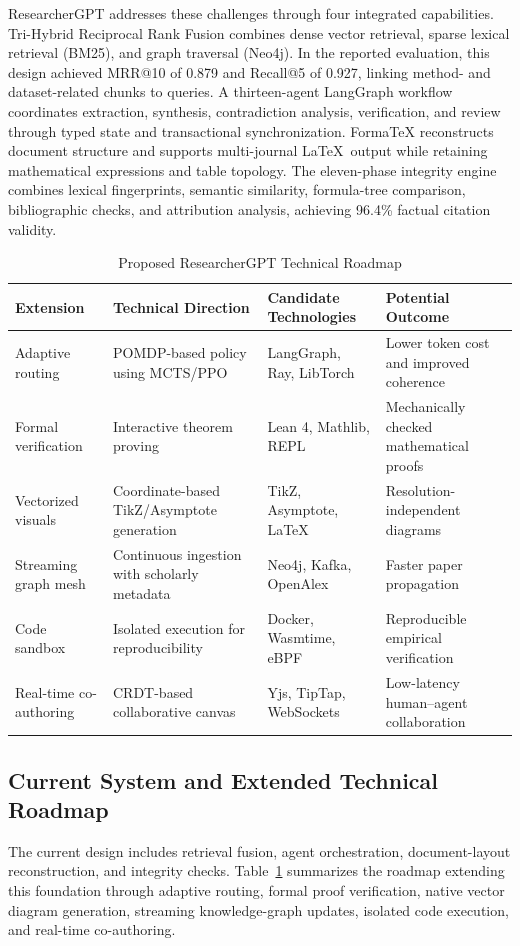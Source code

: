 \documentclass[conference]{IEEEtran}
\begin{document}
ResearcherGPT addresses these challenges through four integrated capabilities. Tri-Hybrid Reciprocal Rank Fusion combines dense vector retrieval, sparse lexical retrieval (BM25), and graph traversal (Neo4j). In the reported evaluation, this design achieved MRR@10 of 0.879 and Recall@5 of 0.927, linking method- and dataset-related chunks to queries. A thirteen-agent LangGraph workflow coordinates extraction, synthesis, contradiction analysis, verification, and review through typed state and transactional synchronization. FormaTeX reconstructs document structure and supports multi-journal \LaTeX\ output while retaining mathematical expressions and table topology. The eleven-phase integrity engine combines lexical fingerprints, semantic similarity, formula-tree comparison, bibliographic checks, and attribution analysis, achieving 96.4\% factual citation validity.

\begin{table}[!t]
\centering
\caption{Proposed ResearcherGPT Technical Roadmap}
\label{tab:roadmap}
\small
\begin{tabularx}{\textwidth}{@{}l X X X@{}}
\toprule
\textbf{Extension} & \textbf{Technical Direction} & \textbf{Candidate Technologies} & \textbf{Potential Outcome} \\
\midrule
Adaptive routing & POMDP-based policy using MCTS/PPO & LangGraph, Ray, LibTorch & Lower token cost and improved coherence \\
Formal verification & Interactive theorem proving & Lean 4, Mathlib, REPL & Mechanically checked mathematical proofs \\
Vectorized visuals & Coordinate-based TikZ/Asymptote generation & TikZ, Asymptote, \LaTeX & Resolution-independent diagrams \\
Streaming graph mesh & Continuous ingestion with scholarly metadata & Neo4j, Kafka, OpenAlex & Faster paper propagation \\
Code sandbox & Isolated execution for reproducibility & Docker, Wasmtime, eBPF & Reproducible empirical verification \\
Real-time co-authoring & CRDT-based collaborative canvas & Yjs, TipTap, WebSockets & Low-latency human--agent collaboration \\
\bottomrule
\end{tabularx}
\end{table}

\subsection{Current System and Extended Technical Roadmap}
The current design includes retrieval fusion, agent orchestration, document-layout reconstruction, and integrity checks. Table~\ref{tab:roadmap} summarizes the roadmap extending this foundation through adaptive routing, formal proof verification, native vector diagram generation, streaming knowledge-graph updates, isolated code execution, and real-time co-authoring.
\end{document}
